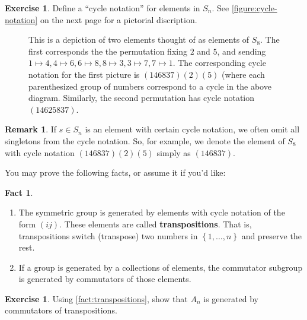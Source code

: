 \documentclass[reqno, 12pt, letter]{article}
\theoremstyle{plain}
\theoremstyle{definition}
\newtheorem{remark}[theorem]{Remark}
\newtheorem{exercise}[theorem]{Exercise}
\newtheorem{fact}[theorem]{Fact}
\theoremstyle{remark}
\numberwithin{equation}{section}
\begin{document}
\begin{exercise}
	\label{exercise:}
	Define a ``cycle notation'' for elements in $S_n$. See \autoref{figure:cycle-notation} on the next page for a pictorial discription.
			\begin{figure}[h!]
				\caption{This is a depiction of two elements thought of as elements of $S_8$. The first corresponds the the permutation fixing $2$ and $5$,
				and sending $1 \mapsto 4, 4 \mapsto 6, 6 \mapsto 8, 8\mapsto 3, 3 \mapsto 7, 7\mapsto 1$.
			The corresponding cycle notation for the first picture is $(146837)(2)(5)$ (where each parenthesized group of numbers
			correspond to a cycle in the above diagram. Similarly, the second permutation has cycle notation $(14625837)$.
			}
\label{figure:cycle-notation}\end{figure}
\end{exercise}
\begin{remark}
	\label{remark:}
	If $s \in S_n$ is an element with certain cycle notation, we often omit all singletons from the cycle notation.
	So, for example, we denote the element of $S_8$ with cycle notation $(146837)(2)(5)$ simply as $(146837)$.
\end{remark}

You may prove the following facts, or assume it if you'd like:
\begin{fact}
	\label{fact:transpositions}
	\begin{enumerate}
		\item The symmetric group is generated by elements with cycle notation of the form $(ij)$. These elements are called {\bf transpositions}. That is, transpositions switch (transpose) two numbers in $\left\{ 1, \ldots, n \right\}$ and preserve the rest.
		\item If a group is generated by a collections of elements, the commutator subgroup is generated by commutators of those elements.
	\end{enumerate}
\end{fact}
\begin{exercise}
	\label{exercise:commutators-generate}
	Using \autoref{fact:transpositions}, show that $A_n$ is generated by commutators of transpositions.
\end{exercise}
\end{document}
